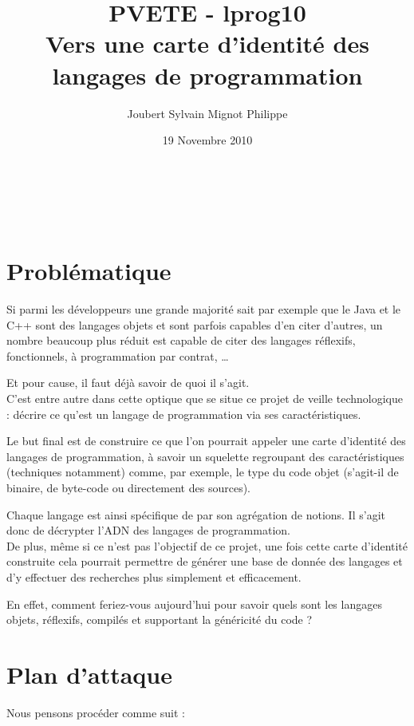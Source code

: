 \documentclass[a4paper, 11pt]{article}
\title{PVETE - lprog10\\
Vers une carte d'identité des langages de programmation}
\author{{\sc Joubert} Sylvain \hspace{1cm} {\sc Mignot} Philippe}
\date{19 Novembre 2010}
\begin{document}

\begin{center}
	\LARGE \thetitle \normalsize \\
	\vspace{2\baselineskip}
	\thedate \\
	\vspace{\baselineskip}
	\theauthor
\end{center}
\vspace*{5em}

\section{Problématique}
Si parmi les développeurs une grande majorité sait par exemple que le Java et le C++ sont des langages objets et sont parfois capables d'en citer d'autres, un nombre beaucoup plus réduit est capable de citer des langages réflexifs, fonctionnels, à programmation par contrat, …

Et pour cause, il faut déjà savoir de quoi il s'agit.\\

C'est entre autre dans cette optique que se situe ce projet de veille technologique : décrire ce qu'est un langage de programmation via ses caractéristiques.

Le but final est de construire ce que l'on pourrait appeler une carte d'identité des langages de programmation, à savoir un squelette regroupant des caractéristiques (techniques notamment) comme, par exemple, le type du code objet (s'agit-il de binaire, de byte-code ou directement des sources).

Chaque langage est ainsi spécifique de par son agrégation de notions. Il s'agit donc de décrypter l'ADN des langages de programmation.\\

De plus, même si ce n'est pas l'objectif de ce projet, une fois cette carte d'identité construite cela pourrait permettre de générer une base de donnée des langages et d'y effectuer des recherches plus simplement et efficacement.

En effet, comment feriez-vous aujourd'hui pour savoir quels sont les langages objets, réflexifs, compilés et supportant la généricité du code ?
	
\section{Plan d'attaque}
Nous pensons procéder comme suit :
\end{document}
